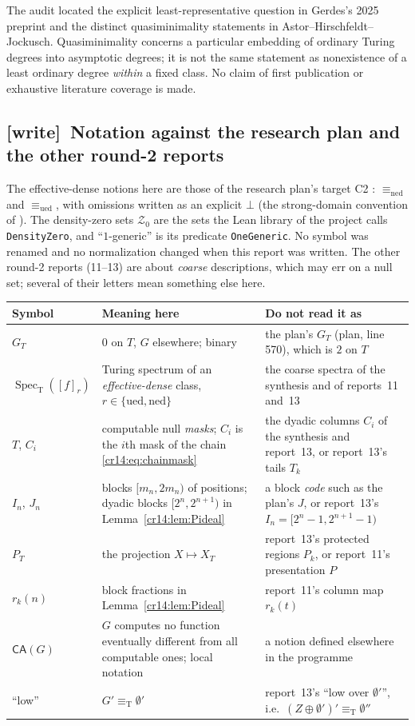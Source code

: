 \documentclass[11pt,a4paper]{article}
\newcommand{\eqT}{\equiv_{\mathrm T}}
\newcommand{\ned}{\mathrm{ned}}
\newcommand{\ued}{\mathrm{ued}}
\newcommand{\Znull}{\mathcal Z_0}
\newcommand{\Spec}{\operatorname{Spec}_{\mathrm T}}
\newcommand{\CA}{\mathsf{CA}}
\theoremstyle{definition}
\theoremstyle{remark}
\newcommand{\wtag}{\textup{[write]}}
\begin{document}
The audit located the explicit least-representative question in Gerdes's
2025 preprint and the distinct quasiminimality statements in
Astor--Hirschfeldt--Jockusch. Quasiminimality concerns a particular embedding
of ordinary Turing degrees into asymptotic degrees; it is not the same
statement as nonexistence of a least ordinary degree \emph{within} a fixed
class.\cite[Theorem~5.9]{AHJ}
No claim of first publication or exhaustive literature coverage is made.

\subsection{\wtag\ Notation against the research plan and the other round-2 reports}
\label{cr14:sec:wnotation}
The effective-dense notions here are those of the research plan's target C2
\cite{ProveIt}: $\equiv_{\ned}$ and $\equiv_{\ued}$, with omissions written
as an explicit $\bot$ (the strong-domain convention of \cite{AHJ}). The
density-zero sets $\Znull$ are the sets the Lean library of the project
calls \texttt{DensityZero}, and ``$1$-generic'' is its predicate
\texttt{OneGeneric}. No symbol was renamed and no normalization changed
when this report was written. The other round-2 reports (11--13) are about
\emph{coarse} descriptions, which may err on a null set; several of their
letters mean something else here.

\begin{center}\small
\begin{tabularx}{\textwidth}{@{}>{\raggedright\arraybackslash}p{}>{\raggedright\arraybackslash}X>{\raggedright\arraybackslash}X@{}}
\toprule
Symbol & Meaning here & Do not read it as\\\midrule
$G_T$ & $0$ on $T$, $G$ elsewhere; binary & the plan's $G_T$ (plan, line 570), which is $2$ on $T$\\
$\Spec([f]_r)$ & Turing spectrum of an \emph{effective-dense} class, $r\in\{\ued,\ned\}$ & the coarse spectra of the synthesis and of reports~11 and~13\\
$T$, $C_i$ & computable null \emph{masks}; $C_i$ is the $i$th mask of the chain \eqref{cr14:eq:chainmask} & the dyadic columns $C_i$ of the synthesis and report~13, or report~13's tails $T_k$\\
$I_n$, $J_n$ & blocks $[m_n,2m_n)$ of positions; dyadic blocks $[2^n,2^{n+1})$ in Lemma~\ref{cr14:lem:Pideal} & a block \emph{code} such as the plan's $J$, or report~13's $I_n=[2^n-1,2^{n+1}-1)$\\
$P_T$ & the projection $X\mapsto X_T$ & report~13's protected regions $P_k$, or report~11's presentation $P$\\
$r_k(n)$ & block fractions in Lemma~\ref{cr14:lem:Pideal} & report~11's column map $r_k(t)$\\
$\CA(G)$ & $G$ computes no function eventually different from all computable ones; local notation & a notion defined elsewhere in the programme\\
``low'' & $G'\eqT\emptyset'$ & report~13's ``low over $\emptyset'$'', i.e.\ $(Z\oplus\emptyset')'\eqT\emptyset''$\\
\bottomrule
\end{tabularx}
\end{center}
\end{document}

